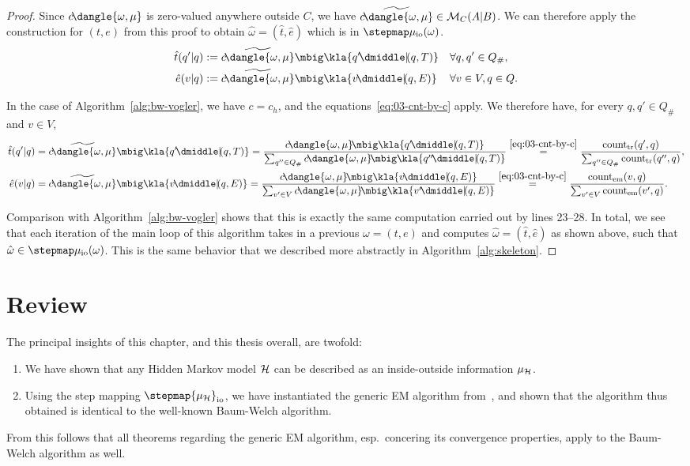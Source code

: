 \begin{proof}
Since $c\!\dangle{\omega,\mu}$ is zero-valued anywhere outside $C$, we have
$\widetilde{c\!\dangle{\omega,\mu}}\in\um_C(A|B)$. We can therefore apply the
 construction for $(t,e)$ from this proof to obtain $\hat\omega=(\hat t,\hat
e)$ which is in $\stepmap\mu_\mathrm{io}(\omega)$.
\begin{align*}
 \hat t(q'|q) &:= \widetilde{c\!\dangle{\omega,\mu}}\mbig\kla{q'\npipe(q,T)} &&\forall q,q'\in Q_\#, \\
 \hat e(v|q) &:= \widetilde{c\!\dangle{\omega,\mu}}\mbig\kla{v\npipe(q,E)} &&\forall v\in V,q\in Q.
\end{align*}

\clearpage
In the case of Algorithm~\ref{alg:bw-vogler}, we have $c=c_h$, and the
equations~\eqref{eq:03-cnt-by-c} apply. We therefore have, for every $q,q'\in
Q_\#$ and $v\in V$,
\begin{align*}
 \hat t(q'|q)
 &= \widetilde{c\!\dangle{\omega,\mu}}\mbig\kla{q'\npipe(q,T)}
 = \frac{c\!\dangle{\omega,\mu}\!\mbig\kla{q'\npipe(q,T)}}{\sum_{q''\in Q_\#}c\!\dangle{\omega,\mu}\!\mbig\kla{q''\npipe(q,T)}}
 \overset{\eqref{eq:03-cnt-by-c}}= \frac{\cnt_\mathrm{tr}(q',q)}{\sum_{q''\in Q_\#} \cnt_\mathrm{tr}(q'',q)}, \\
 \hat e(v|q)
 &= \widetilde{c\!\dangle{\omega,\mu}}\mbig\kla{v\npipe(q,E)}
 = \frac{c\!\dangle{\omega,\mu}\!\mbig\kla{v\npipe(q,E)}}{\sum_{v'\in V}c\!\dangle{\omega,\mu}\!\mbig\kla{v'\npipe(q,E)}}
 \overset{\eqref{eq:03-cnt-by-c}}= \frac{\cnt_\mathrm{em}(v,q)}{\sum_{v'\in V} \cnt_\mathrm{em}(v',q)}.
\end{align*}

Comparison with Algorithm~\ref{alg:bw-vogler} shows that this is exactly the
same computation carried out by lines 23--28. In total, we see that each
iteration of the main loop of this algorithm takes in a previous
$\omega=(t,e)$ and computes $\hat\omega=(\hat t,\hat e)$ as shown above, such
that $\hat\omega\in\stepmap\mu_\mathrm{io}(\omega)$.  This is the same
behavior that we described more abstractly in Algorithm~\ref{alg:skeleton}.
\end{proof}

\section{Review}

The principal insights of this chapter, and this thesis overall, are twofold:
\begin{enumerate}
 \item We have shown that any Hidden Markov model $\mathcal H$ can be described as an
  inside-outside information $\mu_\mathcal H$.
 \item Using the step mapping $\stepmap{\mu_\uh}_\mathrm{io}$, we have
  instantiated the generic EM algorithm from~\cite{bucstuvog15}, and shown that
  the algorithm thus obtained is identical to the well-known Baum-Welch algorithm.
\end{enumerate}

From this follows that all theorems regarding the generic EM algorithm,
esp.~concering its convergence properties, apply to the Baum-Welch algorithm as
well.

